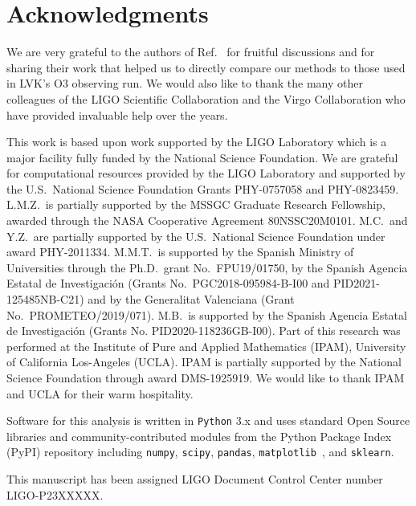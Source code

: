 \section*{Acknowledgments}

We are very grateful to the authors of Ref.~\cite{Chatterjee:2019avs} for fruitful discussions and for sharing their work that helped us to directly compare
our methods to those used in \ac{LVK}'s \ac{O3} observing run. We would also like to thank the many other colleagues of the LIGO Scientific Collaboration and
the Virgo Collaboration who have provided invaluable help over the years.

This work is based upon work supported by the LIGO Laboratory which is a major facility fully funded by the National Science Foundation. We are grateful for
computational resources provided by the LIGO Laboratory and supported by the U.S.\ National Science Foundation Grants PHY-0757058 and PHY-0823459. L.M.Z.\ is partially
supported by the MSSGC Graduate Research Fellowship, awarded through the NASA Cooperative Agreement 80NSSC20M0101. M.C.\ and Y.Z.\ are partially supported by the U.S.\
National Science Foundation under award PHY-2011334. M.M.T.\ is supported by the Spanish Ministry of Universities through the Ph.D.\ grant No.\ FPU19/01750, by the
Spanish Agencia Estatal de Investigaci\'on (Grants No.\ PGC2018-095984-B-I00 and PID2021-125485NB-C21) and by the Generalitat Valenciana (Grant No.\ PROMETEO/2019/071).
M.B.\ is supported by the Spanish Agencia Estatal de Investigaci\'on (Grants No. PID2020-118236GB-I00). Part of this research was performed at the Institute of Pure and
Applied Mathematics (IPAM),  University of California Los-Angeles (UCLA). IPAM is partially supported by the National Science Foundation through award
DMS-1925919. We would like to thank IPAM and UCLA for their warm hospitality. 

Software for this analysis is written in \texttt{Python} 3.x  and uses standard Open Source libraries and community-contributed modules from the Python Package Index (PyPI) repository  including \texttt{numpy}, \texttt{scipy}, \texttt{pandas}, \texttt{matplotlib}~\cite{Hunter:2007ouj}, and \texttt{sklearn}.

This manuscript has been assigned LIGO Document Control Center number LIGO-P23XXXXX.





